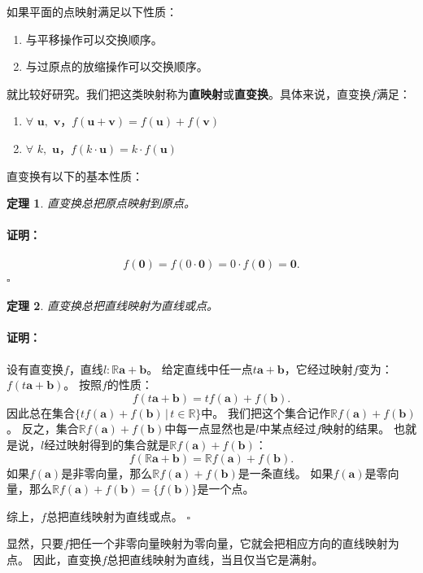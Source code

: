 \documentclass[12pt,UTF8]{ctexbook}
\newtheorem{tm}{定理}[section]
\renewenvironment{proof}{\paragraph{\textbf{证明：}}}{\hfill$\square$}
\begin{document}
如果平面的点映射满足以下性质：
\begin{enumerate}
    \item 与平移操作可以交换顺序。
    \item 与过原点的放缩操作可以交换顺序。
\end{enumerate}
就比较好研究。我们把这类映射称为\textbf{直映射}或\textbf{直变换}。具体来说，直变换$f$满足：
\begin{enumerate}
    \item $\forall \,\,\mathbf{u}, \,\,\mathbf{v}$，$f(\mathbf{u} + \mathbf{v}) = f(\mathbf{u}) + f(\mathbf{v})$
    \item $\forall \,\,k, \,\, \mathbf{u}$，$f(k\cdot \mathbf{u}) = k \cdot f(\mathbf{u})$
\end{enumerate}
直变换有以下的基本性质：
\begin{tm}
    直变换总把原点映射到原点。
\end{tm}
\begin{proof}
    $$f(\mathbf{0}) = f(0\cdot \mathbf{0}) = 0 \cdot f(\mathbf{0}) = \mathbf{0}.$$
\end{proof}
\begin{tm}
    直变换总把直线映射为直线或点。
\end{tm}
\begin{proof}
    设有直变换$f$，直线$l: \mathbb{R}\mathbf{a} + \mathbf{b}$。
    给定直线中任一点$t\mathbf{a} + \mathbf{b}$，它经过映射$f$变为：$f(t\mathbf{a} + \mathbf{b})$。
    按照$f$的性质：
    $$ f(t\mathbf{a} + \mathbf{b}) = tf(\mathbf{a}) + f(\mathbf{b}).$$
    因此总在集合$\{tf(\mathbf{a}) + f(\mathbf{b})\,|\, t\in\mathbb{R}\}$中。
    我们把这个集合记作$\mathbb{R}f(\mathbf{a}) + f(\mathbf{b})$。
    反之，集合$\mathbb{R}f(\mathbf{a}) + f(\mathbf{b})$中每一点显然也是$l$中某点经过$f$映射的结果。
    也就是说，$l$经过映射得到的集合就是$\mathbb{R}f(\mathbf{a}) + f(\mathbf{b})$：
    $$ f(\mathbb{R}\mathbf{a} + \mathbf{b}) = \mathbb{R}f(\mathbf{a}) + f(\mathbf{b}).$$
    如果$f(\mathbf{a})$是非零向量，那么$\mathbb{R}f(\mathbf{a}) + f(\mathbf{b})$是一条直线。
    如果$f(\mathbf{a})$是零向量，那么$\mathbb{R}f(\mathbf{a}) + f(\mathbf{b}) = \{f(\mathbf{b})\}$是一个点。

    综上，$f$总把直线映射为直线或点。
\end{proof}

显然，只要$f$把任一个非零向量映射为零向量，它就会把相应方向的直线映射为点。
因此，直变换$f$总把直线映射为直线，当且仅当它是满射。
\end{document}
